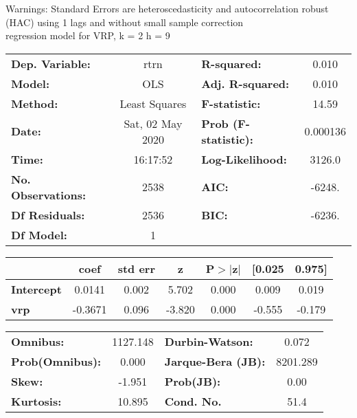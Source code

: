 Warnings: \newline
 [1] Standard Errors are heteroscedasticity and autocorrelation robust (HAC) using 1 lags and without small sample correction\\ 

regression model for VRP, k = 2 h = 9\begin{center}
\begin{tabular}{lclc}
\toprule
\textbf{Dep. Variable:}    &       rtrn       & \textbf{  R-squared:         } &     0.010   \\
\textbf{Model:}            &       OLS        & \textbf{  Adj. R-squared:    } &     0.010   \\
\textbf{Method:}           &  Least Squares   & \textbf{  F-statistic:       } &     14.59   \\
\textbf{Date:}             & Sat, 02 May 2020 & \textbf{  Prob (F-statistic):} &  0.000136   \\
\textbf{Time:}             &     16:17:52     & \textbf{  Log-Likelihood:    } &    3126.0   \\
\textbf{No. Observations:} &        2538      & \textbf{  AIC:               } &    -6248.   \\
\textbf{Df Residuals:}     &        2536      & \textbf{  BIC:               } &    -6236.   \\
\textbf{Df Model:}         &           1      & \textbf{                     } &             \\
\bottomrule
\end{tabular}
\begin{tabular}{lcccccc}
                   & \textbf{coef} & \textbf{std err} & \textbf{z} & \textbf{P$> |$z$|$} & \textbf{[0.025} & \textbf{0.975]}  \\
\midrule
\textbf{Intercept} &       0.0141  &        0.002     &     5.702  &         0.000        &        0.009    &        0.019     \\
\textbf{vrp}       &      -0.3671  &        0.096     &    -3.820  &         0.000        &       -0.555    &       -0.179     \\
\bottomrule
\end{tabular}
\begin{tabular}{lclc}
\textbf{Omnibus:}       & 1127.148 & \textbf{  Durbin-Watson:     } &    0.072  \\
\textbf{Prob(Omnibus):} &   0.000  & \textbf{  Jarque-Bera (JB):  } & 8201.289  \\
\textbf{Skew:}          &  -1.951  & \textbf{  Prob(JB):          } &     0.00  \\
\textbf{Kurtosis:}      &  10.895  & \textbf{  Cond. No.          } &     51.4  \\
\bottomrule
\end{tabular}
\end{center}

